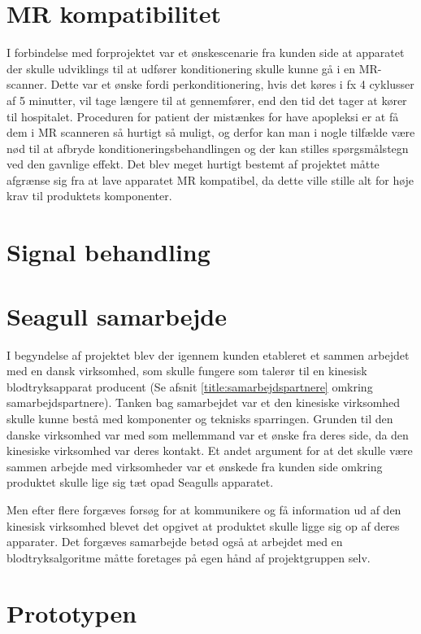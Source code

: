\section{MR kompatibilitet}
I forbindelse med forprojektet var et ønskescenarie fra kunden side at apparatet der skulle udviklings til at udfører konditionering skulle kunne gå i en MR-scanner. Dette var et ønske fordi perkonditionering, hvis det køres i fx 4 cyklusser af 5 minutter, vil tage længere til at gennemfører, end den tid det tager at kører til hospitalet. Proceduren for patient der mistænkes for have apopleksi er at få dem i MR scanneren så hurtigt så muligt, og derfor kan man i nogle tilfælde være nød til at afbryde konditioneringsbehandlingen og der kan stilles spørgsmålstegn ved den gavnlige effekt. Det blev meget hurtigt bestemt af projektet måtte afgrænse sig fra at lave apparatet MR kompatibel, da dette ville stille alt for høje krav til produktets komponenter.

\section{Signal behandling}

\section{Seagull samarbejde}
I begyndelse af projektet blev der igennem kunden etableret et sammen arbejdet med en dansk virksomhed, som skulle fungere som talerør til en kinesisk blodtryksapparat producent (Se afsnit \ref{title:samarbejdspartnere} omkring samarbejdspartnere). Tanken bag samarbejdet var et den kinesiske virksomhed skulle kunne bestå med komponenter og teknisks sparringen. Grunden til den danske virksomhed var med som mellemmand var et ønske fra deres side, da den kinesiske virksomhed var deres kontakt. Et andet argument for at det skulle være sammen arbejde med virksomheder var et ønskede fra kunden side omkring produktet skulle lige sig tæt opad Seagulls apparatet. 

Men efter flere forgæves forsøg for at kommunikere og få information ud af den kinesisk virksomhed blevet det opgivet at produktet skulle ligge sig op af deres apparater. Det forgæves samarbejde betød også at arbejdet med en blodtryksalgoritme måtte foretages på egen hånd af projektgruppen selv. 

\section{Prototypen}